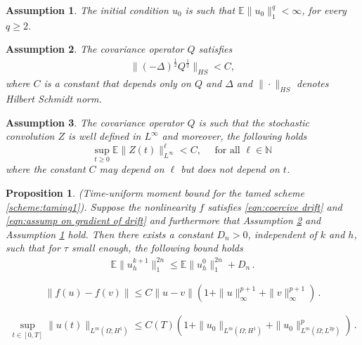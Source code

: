 \documentclass[10pt,a4paper]{amsart}
\newtheorem{assumption}{Assumption}
\newtheorem{proposition}{Proposition}
\begin{document}
\begin{assumption}\label{assump3}
 The initial condition $u_0$ is such that 
$
\mathbb{E}\|u_0\|_{1}^q<\infty$,  for every  $q\geq 2.$
\end{assumption}

\begin{assumption}\label{assump2}
The covariance operator $Q$ satisfies
\begin{align}
\|(-\Delta)^{\frac{1}{2}}Q^{\frac{1}{2}}\|_{HS}<C,
\end{align}
where $C$ is a constant that depends only on $Q$ and $\Delta$ and $\| \cdot \|_{HS}$ denotes Hilbert Schmidt norm.  
\end{assumption}

\begin{assumption}\label{assumption: on the covariance operator Q} The covariance operator $Q$ is such that the stochastic convolution $Z$ is well defined in $L^{\infty}$ and moreover, the following holds
$$
\sup_{t\geq 0} \mathbb E \|Z(t)\|^\ell_{L^{\infty}} < C, \quad \mbox{ for all } \ell \in \mathbb N \, 
$$
where the constant $C$ may depend on $\ell$ but does not depend on $t$. 
\end{assumption}

\begin{proposition}\label{them: uniform in time moment bound for tamed}
(Time-uniform moment bound for the tamed scheme \eqref{scheme:taming1}).  Suppose the nonlinearity $f$ satisfies \eqref{eqn:coercive drift} and \eqref{eqn:assump on gradient of drift} and furthermore that Assumption \ref{assump2} and Assumption \ref{assump3} hold. Then there exists a constant  $D_n>0$, independent of $k$ and $h$,  such that for $\tau$ small enough, the following bound holds
\begin{align}
\mathbb{E} \| u_h^{k+1}\|_1^{2n}\leq  \mathbb{E} \| u_h^{0}\|_1^{2n}+D_n \,.
\end{align}
\end{proposition}

\begin{equation}\label{eqn: f polynomial}
\|f(u)-f(v)\|\leq C \|u-v\|(1+\|u\|_\infty^{p+1}+\|v\|_\infty^{p+1}) \,.
\end{equation}

\begin{align}\label{eq:p61u2}
\sup\limits_{t\in [0,T]} \|u(t)\|_{L^{m}(\Omega; H^1)}\leq C(T)(1+\|u_0\|_{L^{m}(\Omega; H^1)}+\|u_0\|^p_{L^m(\Omega; L^{2p})}) \,.
\end{align}
\end{document}
